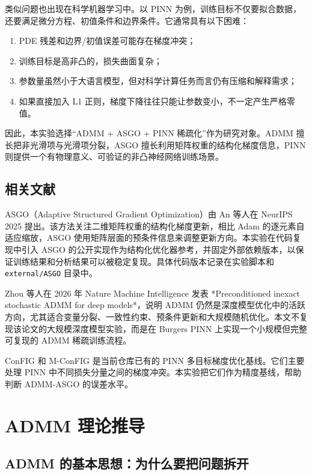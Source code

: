 \documentclass[UTF8,a4paper,12pt,fontset=none]{ctexart}
\begin{document}
类似问题也出现在科学机器学习中。以 PINN 为例，训练目标不仅要拟合数据，还要满足微分方程、初值条件和边界条件。它通常具有以下困难：

\begin{enumerate}
\item PDE 残差和边界/初值误差可能存在梯度冲突；
\item 训练目标是高非凸的，损失曲面复杂；
\item 参数量虽然小于大语言模型，但对科学计算任务而言仍有压缩和解释需求；
\item 如果直接加入 L1 正则，梯度下降往往只能让参数变小，不一定产生严格零值。
\end{enumerate}

因此，本实验选择“ADMM + ASGO + PINN 稀疏化”作为研究对象。ADMM 擅长把非光滑项与光滑项分裂，ASGO 擅长利用矩阵权重的结构化梯度信息，PINN 则提供一个有物理意义、可验证的非凸神经网络训练场景。

\subsection{相关文献}

ASGO（Adaptive Structured Gradient Optimization）由 An 等人在 NeurIPS 2025 提出。该方法关注二维矩阵权重的结构化梯度更新，相比 Adam 的逐元素自适应缩放，ASGO 使用矩阵层面的预条件信息来调整更新方向。本实验在代码复现中引入 ASGO 的公开实现作为结构化优化器参考，并固定外部依赖版本，以保证训练结果和分析结果可以被稳定复现。具体代码版本记录在实验脚本和 \texttt{external/ASGO} 目录中。

Zhou 等人在 2026 年 Nature Machine Intelligence 发表 *Preconditioned inexact stochastic ADMM for deep models*，说明 ADMM 仍然是深度模型优化中的活跃方向，尤其适合变量分裂、一致性约束、预条件更新和大规模随机优化。本文不复现该论文的大规模深度模型实验，而是在 Burgers PINN 上实现一个小规模但完整可复现的 ADMM 稀疏训练流程。

ConFIG 和 M-ConFIG 是当前仓库已有的 PINN 多目标梯度优化基线。它们主要处理 PINN 中不同损失分量之间的梯度冲突。本实验把它们作为精度基线，帮助判断 ADMM-ASGO 的误差水平。

\section{ADMM 理论推导}

\subsection{ADMM 的基本思想：为什么要把问题拆开}
\end{document}
